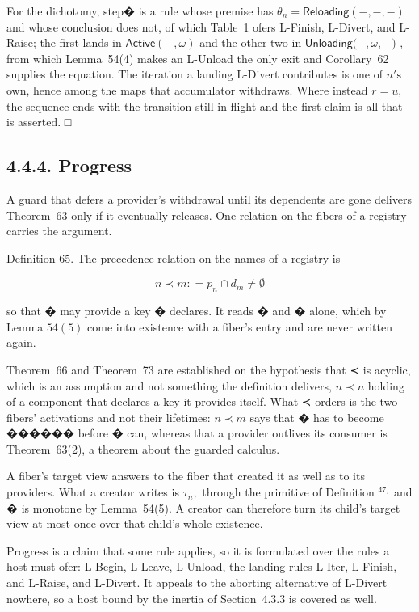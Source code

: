 \documentclass[
  10
]{article}
\begin{document}
For the dichotomy, step� is a rule whose premise has
\(\theta _ { n } = { \mathsf { R e l o a d i n g } } ( - , - , - )\) and
whose conclusion does not, of which Table~1 ofers L-Finish, L-Divert,
and L-Raise; the first lands in
\(\mathsf { A c t i v e } ( - , \omega )\) and the other two in
\(\mathsf { U n l o a d i n g ( - , } \omega , - \mathsf { ) }\) , from
which Lemma~54(4) makes an L-Unload the only exit and Corollary~62
supplies the equation. The iteration a landing L-Divert contributes is
one of \(n \mathrm { { ' s } }\) own, hence among the maps that
accumulator withdraws. Where instead \(r = u ,\) the sequence ends with
the transition still in flight and the first claim is all that is
asserted. □

\subsection{4.4.4. Progress}\label{progress}

A guard that defers a provider's withdrawal until its dependents are
gone delivers Theorem~63 only if it eventually releases. One relation on
the fibers of a registry carries the argument.

Definition 65. The precedence relation on the names of a registry is

\[
n \prec m : = p _ { n } \cap d _ { m } \neq \emptyset\tag{60}
\]

so that � may provide a key � declares. It reads � and � alone, which by
Lemma \(5 4 ( 5 )\) come into existence with a fiber's entry and are
never written again.

Theorem~66 and Theorem~73 are established on the hypothesis that ≺ is
acyclic, which is an assumption and not something the definition
delivers, \(n \prec n\) holding of a component that declares a key it
provides itself. What ≺ orders is the two fibers' activations and not
their lifetimes: \(n \prec m\) says that � has to become ������ before �
can, whereas that a provider outlives its consumer is Theorem~63(2), a
theorem about the guarded calculus.

A fiber's target view answers to the fiber that created it as well as to
its providers. What a creator writes is \(\tau _ { n } ,\) through the
primitive of Definition \(^ { 4 7 , }\) and � is monotone by
Lemma~54(5). A creator can therefore turn its child's target view at
most once over that child's whole existence.

Progress is a claim that some rule applies, so it is formulated over the
rules a host must ofer: L-Begin, L-Leave, L-Unload, the landing rules
L-Iter, L-Finish, and L-Raise, and L-Divert. It appeals to the aborting
alternative of L-Divert nowhere, so a host bound by the inertia of
Section~4.3.3 is covered as well.
\end{document}
